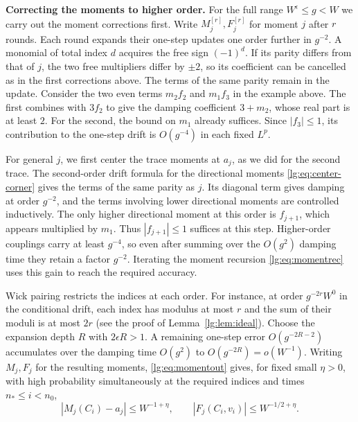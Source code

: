\documentclass[11pt]{article}
\numberwithin{equation}{section}
\theoremstyle{remark}
\begin{document}
\medskip\noindent\textbf{Correcting the moments to higher order.}
For the full range $W^\epsilon\le g<W$ we carry out the moment corrections first.
Write $M_j^{[r]},F_j^{[r]}$ for moment $j$ after $r$ rounds.
Each round expands their one-step updates one order further in $g^{-2}$.
A monomial of total index $d$ acquires the free sign $(-1)^d$.
If its parity differs from that of $j$, the two free multipliers
differ by $\pm2$, so its coefficient can be cancelled as in the first
corrections above. The terms of the same parity remain in the update.
Consider the two even terms $m_2f_2$ and $m_1f_3$ in the example above.
The first combines with $3f_2$ to give the damping coefficient $3+m_2$,
whose real part is at least $2$. For the second, the bound on $m_1$
already suffices. Since $|f_3|\le1$, its contribution to the one-step
drift is $O(g^{-4})$ in each fixed $L^p$.

For general $j$, we first center the trace moments at $a_j$, as we
did for the second trace. The second-order drift formula for the
directional moments \eqref{lg:eq:center-corner} gives the terms of
the same parity as $j$. Its diagonal term gives damping at order
$g^{-2}$, and the terms involving lower directional moments are
controlled inductively. The only higher directional moment at this
order is $f_{j+1}$, which appears multiplied by $m_1$. Thus
$|f_{j+1}|\le1$ suffices at this step. Higher-order couplings carry
at least $g^{-4}$, so even after summing over the $O(g^2)$ damping
time they retain a factor $g^{-2}$. Iterating the moment recursion
\eqref{lg:eq:momentrec} uses this gain to reach the required accuracy.

Wick pairing restricts the indices at each
order. For instance, at order $g^{-2r}W^0$ in the conditional drift,
each index has modulus at most $r$ and the sum of their moduli is at
most $2r$ (see the proof of Lemma~\ref{lg:lem:ideal}).
Choose the expansion depth $R$ with $2\epsilon R>1$. A remaining
one-step error $O(g^{-2R-2})$ accumulates over the damping time
$O(g^2)$ to $O(g^{-2R})=o(W^{-1})$. Writing $M_j,F_j$ for the
resulting moments, \eqref{lg:eq:momentout} gives, for fixed small
$\eta>0$, with high probability simultaneously at the required indices
and times $n_*\le i<n_0$,
\[
 |M_j(C_i)-a_j|\le W^{-1+\eta},\qquad
 |F_j(C_i,v_i)|\le W^{-1/2+\eta}.
\]
\end{document}
